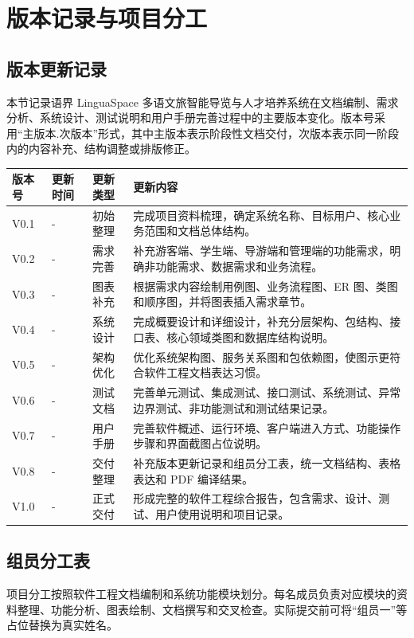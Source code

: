 \chapter{版本记录与项目分工}

\section{版本更新记录}

本节记录语界 LinguaSpace 多语文旅智能导览与人才培养系统在文档编制、需求分析、系统设计、测试说明和用户手册完善过程中的主要版本变化。版本号采用“主版本.次版本”形式，其中主版本表示阶段性文档交付，次版本表示同一阶段内的内容补充、结构调整或排版修正。

\begin{longtable}{@{}p{1.7cm}p{2.5cm}p{3.0cm}p{5.6cm}@{}}
\toprule
版本号 & 更新时间 & 更新类型 & 更新内容 \\
\midrule
V0.1 & - & 初始整理 & 完成项目资料梳理，确定系统名称、目标用户、核心业务范围和文档总体结构。 \\
V0.2 & - & 需求完善 & 补充游客端、学生端、导游端和管理端的功能需求，明确非功能需求、数据需求和业务流程。 \\
V0.3 & - & 图表补充 & 根据需求内容绘制用例图、业务流程图、ER 图、类图和顺序图，并将图表插入需求章节。 \\
V0.4 & - & 系统设计 & 完成概要设计和详细设计，补充分层架构、包结构、接口表、核心领域类图和数据库结构说明。 \\
V0.5 & - & 架构优化 & 优化系统架构图、服务关系图和包依赖图，使图示更符合软件工程文档表达习惯。 \\
V0.6 & - & 测试文档 & 完善单元测试、集成测试、接口测试、系统测试、异常边界测试、非功能测试和测试结果记录。 \\
V0.7 & - & 用户手册 & 完善软件概述、运行环境、客户端进入方式、功能操作步骤和界面截图占位说明。 \\
V0.8 & - & 交付整理 & 补充版本更新记录和组员分工表，统一文档结构、表格表达和 PDF 编译结果。 \\
V1.0 & - & 正式交付 & 形成完整的软件工程综合报告，包含需求、设计、测试、用户使用说明和项目记录。 \\
\bottomrule
\end{longtable}

\section{组员分工表}

项目分工按照软件工程文档编制和系统功能模块划分。每名成员负责对应模块的资料整理、功能分析、图表绘制、文档撰写和交叉检查。实际提交前可将“组员一”等占位替换为真实姓名。

